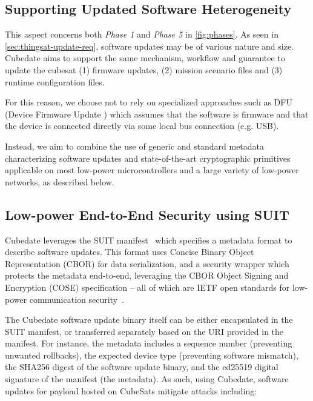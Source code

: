 \subsection{Supporting Updated Software Heterogeneity}
This aspect concerns both \textit{Phase 1} and \textit{Phase 5} in \autoref{fig:phases}. 
As seen in \autoref{sec:thingsat-update-req}, software updates may be of various nature and size.
Cubedate aims to support the same mechanism, workflow and guarantee to update the cubesat (1) firmware updates, (2) mission scenario files and (3) runtime configuration files.

For this reason, we choose not to rely on specialized approaches such as DFU (Device Firmware Update \cite{beningo2018dfu}) which assumes that the software is firmware and that the device is connected directly via some local bus connection (e.g. USB).

Instead, we aim to combine the use of generic and standard metadata characterizing software updates and state-of-the-art cryptographic primitives applicable on most low-power microcontrollers and a large variety of low-power networks, as described below.

\subsection{Low-power End-to-End Security using SUIT}

Cubedate leverages the SUIT manifest~\cite{suit-manifest} which specifies a metadata format to describe software updates. This format uses Concise Binary Object Representation (CBOR) for data serialization, and a security wrapper which protects the metadata end-to-end, leveraging the CBOR Object Signing and Encryption (COSE) specification -- all of which are IETF open standards for low-power communication security~\cite{tschofenig2019cyberphysical}.

The Cubedate software update binary itself can be either encapsulated in the SUIT manifest, or transferred separately based on the URI provided in the manifest.
For instance, the metadata includes a sequence number (preventing unwanted rollbacks), the expected device type (preventing software mismatch), the SHA256 digest of the software update binary, and the ed25519 digital signature of the manifest (the metadata).
As such, using Cubedate, software updates for payload hosted on CubeSats mitigate attacks including:

